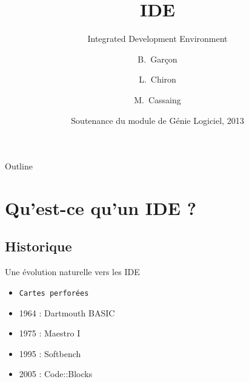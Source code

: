 \documentclass{beamer}
\title{IDE}
\subtitle
{Integrated Development Environment}
\author[Garçon, Chiron, Cassaing] %
{B.~Garçon\inst{1} \and L.~Chiron\inst{2} \and M.~Cassaing\inst{3}}
\institute[ISIMA] %
{
  \inst{1}%
  Étudiant de Prep'ISIMA
  \and
  \inst{2}%
  Étudiant de Prep'ISIMA
  \and
  \inst{3}%
  Étudiante de Prep'ISIMA}
\date[SGL 2013] %
{Soutenance du module de Génie Logiciel, 2013}
\begin{document}
\begin{frame}
  \titlepage
\end{frame}

\begin{frame}{Outline}
  \tableofcontents
\end{frame}





\section{Qu'est-ce qu'un IDE ?}

\subsection{Historique}

\begin{frame}{Une évolution naturelle vers les IDE}

  \begin{itemize}
  \item
    \texttt{Cartes perforées}
  \item
    1964 : Dartmouth BASIC
  \item
     1975 : Maestro I
  \item
     1995 : Softbench
  \item
     2005 : Code::Blocks
  \end{itemize}
\end{frame}
\end{document}
